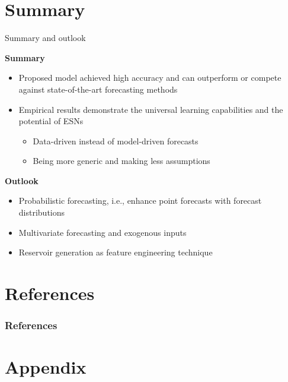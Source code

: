 \documentclass[aspectratio=169]{beamer}
\begin{document}
\section{Summary}


\begin{frame}[t]{Summary and outlook}
    \begin{minipage}[t]{0.5\textwidth}
        \vspace{0pt}
        \textbf{Summary}
        \begin{itemize}
            \item Proposed model achieved high accuracy and can outperform or compete against state-of-the-art forecasting methods
            \item Empirical results demonstrate the universal learning capabilities and the potential of ESNs
            \begin{itemize}
            	\item Data-driven instead of model-driven forecasts
            	\item Being more generic and making less assumptions
            \end{itemize}
        \end{itemize}
    \end{minipage}%
    \hfill
    \begin{minipage}[t]{0.5\textwidth}
        \vspace{0pt}
        \textbf{Outlook}
        \begin{itemize}
        	\item Probabilistic forecasting, i.e., enhance point forecasts with forecast distributions
        	\item Multivariate forecasting and exogenous inputs
        	\item Reservoir generation as feature engineering technique
        \end{itemize}
    \end{minipage}
\end{frame}


\section{References}

\begin{frame}[allowframebreaks]
    \frametitle{References}
    \nocite{*}
    \printbibliography[heading=none]
\end{frame}


\section{Appendix}
\end{document}
